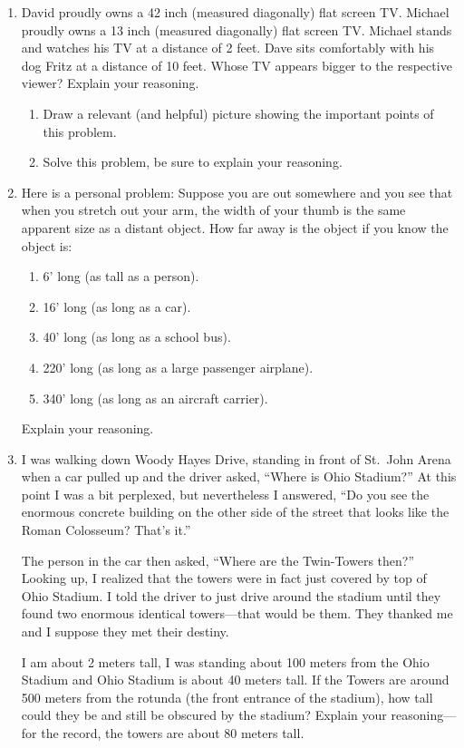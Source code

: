 \begin{problems}
\begin{enumerate}
\item David proudly owns a 42 inch (measured diagonally) flat screen
  TV. Michael proudly owns a 13 inch (measured diagonally) flat screen
  TV. Michael stands and watches his TV at a distance of 2 feet. Dave
  sits comfortably with his dog Fritz at a distance of 10 feet. Whose
  TV appears bigger to the respective viewer? Explain your reasoning.
\begin{enumerate}
\item Draw a relevant (and helpful) picture showing the important
  points of this problem.
\item Solve this problem, be sure to explain your reasoning.
\end{enumerate}

\item Here is a personal problem: Suppose you are out somewhere and
  you see that when you stretch out your arm, the width of your thumb
  is the same apparent size as a distant object. How far away is the
  object if you know the object is:
\begin{enumerate}
\item 6' long (as tall as a person).
\item 16' long (as long as a car).
\item 40' long (as long as a school bus).
\item 220' long (as long as a large passenger airplane).
\item 340' long (as long as an aircraft carrier).
\end{enumerate}
Explain your reasoning.

\item I was walking down Woody Hayes Drive, standing in front of
  St.\ John Arena when a car pulled up and the driver asked, ``Where
  is Ohio Stadium?'' At this point I was a bit perplexed, but
  nevertheless I answered, ``Do you see the enormous concrete building
  on the other side of the street that looks like the Roman Colosseum?
  That's it.''
 
The person in the car then asked, ``Where are the Twin-Towers then?''
Looking up, I realized that the towers were in fact just covered by
top of Ohio Stadium. I told the driver to just drive around the
stadium until they found two enormous identical towers---that would be
them. They thanked me and I suppose they met their destiny.

I am about 2 meters tall, I was standing about 100 meters from the
Ohio Stadium and Ohio Stadium is about 40 meters tall. If the Towers
are around 500 meters from the rotunda (the front entrance of the
stadium), how tall could they be and still be obscured by the stadium?
Explain your reasoning---for the record, the towers are about 80
meters tall.



\end{enumerate}
\end{problems}
